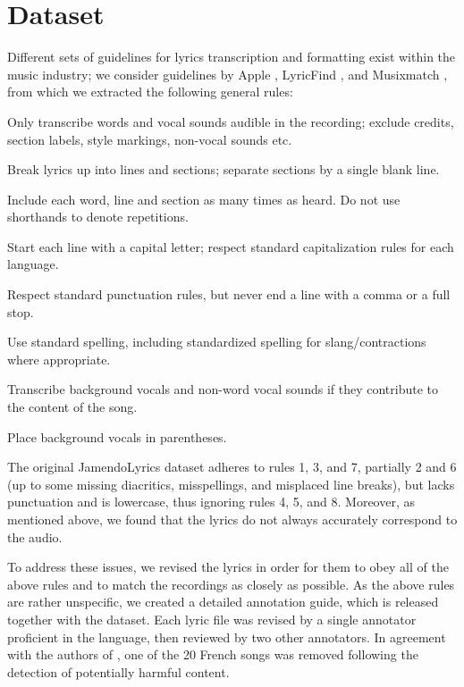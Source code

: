 \documentclass{article}
\begin{document}
\section{Dataset}
Different sets of guidelines for lyrics transcription and formatting exist within the music industry; we consider guidelines by Apple \cite{apple-lyrics-guidelines}, LyricFind \cite{lyricfind-guidelines}, and Musixmatch \cite{musixmatch-lyric-guidelines}, from which we extracted the following general rules:
\begin{compactenum}
    \item Only transcribe words and vocal sounds audible in the recording; exclude credits, section labels, style markings, non-vocal sounds etc.
    \item Break lyrics up into lines and sections; separate sections by a single blank line.
    \item Include each word, line and section as many times as heard. Do not use shorthands to denote repetitions.
    \item Start each line with a capital letter; respect standard capitalization rules for each language.
    \item Respect standard punctuation rules, but never end a line with a comma or a full stop.
    \item Use standard spelling, including stan\-dard\-ized spell\-ing for slang/contractions where appropriate.
    \item Transcribe background vocals and non-word vocal sounds if they contribute to the content of the song.
    \item Place background vocals in parentheses.
\end{compactenum}
The original JamendoLyrics dataset adheres to rules 1, 3, and 7, partially 2 and 6 (up to some missing diacritics, misspellings, and misplaced line breaks), but lacks punctuation and is lowercase, thus ignoring rules 4, 5, and 8. Moreover, as mentioned above, we found that the lyrics do not always accurately correspond to the audio.


To address these issues, we revised the lyrics in order for them to obey all of the above rules and to match the recordings as closely as possible.
As the above rules are rather unspecific, we created a detailed annotation guide, which is released together with the dataset.
Each lyric file was revised by a single annotator proficient in the language, then reviewed by two other annotators. In agreement with the authors of \cite{durand-2023-contrastive}, one of the 20 French songs was removed following the detection of potentially harmful content.
\end{document}
